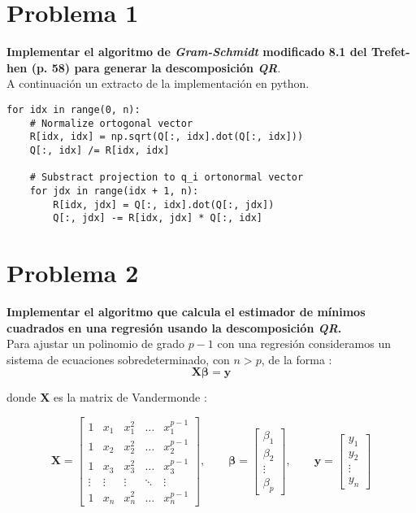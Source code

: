 \documentclass[12pt,letterpaper]{article}
\begin{document}
\section*{Problema 1}

\textbf{Implementar el algoritmo de \textit{Gram-Schmidt} modificado 8.1 del Trefet-hen (p. 58) para generar la descomposici\'on \textit{QR}}.\\

A continuaci\'on un extracto de la implementaci\'on en python.

\begin{lstlisting}[style = Python]
for idx in range(0, n):
    # Normalize ortogonal vector
    R[idx, idx] = np.sqrt(Q[:, idx].dot(Q[:, idx]))
    Q[:, idx] /= R[idx, idx]

    # Substract projection to q_i ortonormal vector
    for jdx in range(idx + 1, n):
        R[idx, jdx] = Q[:, idx].dot(Q[:, jdx])
        Q[:, jdx] -= R[idx, jdx] * Q[:, idx]
\end{lstlisting}



\section*{Problema 2}

\textbf{Implementar el algoritmo que calcula el estimador de m\'inimos cuadrados en una regresi\'on usando la descomposici\'on \textit{QR}.}\\

Para ajustar un polinomio de grado $p - 1$ con una regresi\'on consideramos un sistema de ecuaciones sobredeterminado, con $n > p$, de la forma : 
\begin{equation}
\mathbf {X} \boldsymbol {\beta} = \mathbf {y}  
\end{equation}

donde \textbf{X} es la matrix de Vandermonde :

\begin{equation}
\mathbf {X}=\begin{bmatrix}
1 & x_1 & x_1^2 & \dots & x_1^{p-1}\\
1 & x_2 & x_2^2 & \dots & x_2^{p-1}\\
1 & x_3 & x_3^2 & \dots & x_3^{p-1}\\
\vdots & \vdots & \vdots & \ddots &\vdots \\
1 & x_n & x_n^2 & \dots & x_n^{p-1}
\end{bmatrix},
%
\qquad \boldsymbol \beta = \begin{bmatrix}
\beta_1 \\ \beta_2 \\ \vdots \\ \beta_p \end{bmatrix},
%
\qquad \mathbf y = \begin{bmatrix}
y_1 \\ y_2 \\ \vdots \\ y_n
\end{bmatrix}
%
\end{equation}
\end{document}
